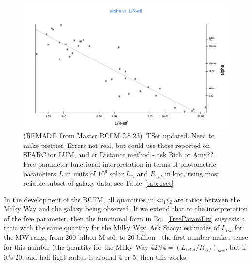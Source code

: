 \documentclass[reprint,%
 amsmath,amssymb,
 aps,
]{revtex4-1}
\begin{document}
 \begin{figure}[h!]
\includegraphics[width=\linewidth]{figures/alphavL_Reff2_8_23.png} 
\caption{ {\color{blue}(REMADE From Master RCFM 2.8.23), TSet updated. Need to make prettier.  Errors not real, but could use those reported on SPARC for LUM, and or Distance method - ask Rich or Amy??}.  Free-parameter functional interpretation in terms of  photometric parameters $L$ in units of $10^9$ solar  $L_\odot$ and $R_{eff}$ in kpc, using most reliable subset of galaxy data, see  Table~\ref{tab:Tset}.  }
\label{alpha2}
\end{figure}  
 
In the development of the RCFM, all quantities in $\kappa v_1 v_2$ are ratios between  the Milky Way and the galaxy being observed. If we extend that to the interpretation of the free parameter, then 
the functional form in Eq.~\ref{FreeParamFix}   suggests a ratio with the same quantity for the Milky Way. {\color{blue} Ask Stacy: estimates of $L_{tot}$ for the MW range from 200 billion M-sol, to 20 billion - the first number makes sense for this number (the quantity for the Milky Way  $42.94 =(L_{total}/R_{eff})_{mw} $, but if it's 20, and half-light radius is around 4 or 5, then this works}. 
  

 
\end{document}
